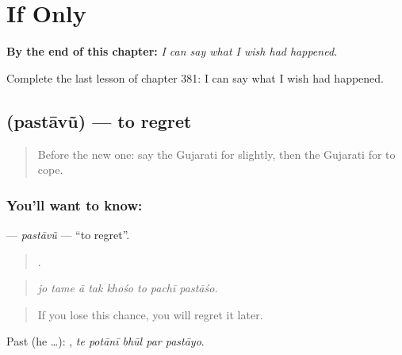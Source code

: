 
\chapter{If Only}
\label{ch:gu-if-only}

\begin{chapteropening}
\textbf{By the end of this chapter:} \emph{I can say what I wish had happened.}

Complete the last lesson of chapter 381: I can say what I wish had happened.
\end{chapteropening}

\section[\texorpdfstring{\gu{પસ્તાવું} (pastāvũ)}{પસ્તાવું (pastāvũ)}]{ (pastāvũ) — to regret}

\label{lesson:GU-C381-pastavu}



\begin{quote}
Before the new one: say the Gujarati for slightly, then the Gujarati for to cope.
\end{quote}

\subsection*{You'll want to know: }
\textbf{} — \emph{pastāvũ} — \textquotedblleft{}to regret\textquotedblright{}.

\begin{quote}
       .
\end{quote}

\begin{quote}
\emph{jo tame ā tak khośo to pachī pastāśo.}
\end{quote}

\begin{quote}
If you lose this chance, you will regret it later.
\end{quote}

Past (he …):     , \emph{te potānī bhūl par pastāyo}.

